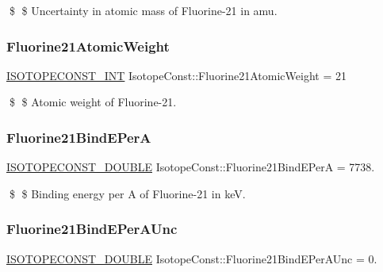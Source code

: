 \$ \$ Uncertainty in atomic mass of Fluorine-\/21 in amu. \mbox{\label{group___isotope_const-_fluorine-_f21_ga8ecdc839093fe8b2f0d6ca28c7af001a}} 
\subsubsection{\texorpdfstring{Fluorine21\+Atomic\+Weight}{Fluorine21AtomicWeight}}
{\footnotesize\ttfamily \mbox{\hyperlink{group___isotope_const-_macros_ga5f18360b3e99483a35c32d789e62621c}{I\+S\+O\+T\+O\+P\+E\+C\+O\+N\+S\+T\+\_\+\+I\+NT}} Isotope\+Const\+::\+Fluorine21\+Atomic\+Weight = 21}

\$ \$ Atomic weight of Fluorine-\/21. \mbox{\label{group___isotope_const-_fluorine-_f21_ga8d1382bebc1fc1184b1b12cb4f8cc928}} 
\subsubsection{\texorpdfstring{Fluorine21\+Bind\+E\+PerA}{Fluorine21BindEPerA}}
{\footnotesize\ttfamily \mbox{\hyperlink{group___isotope_const-_macros_ga8f45a7272ce02c0b4c65c44636ed719a}{I\+S\+O\+T\+O\+P\+E\+C\+O\+N\+S\+T\+\_\+\+D\+O\+U\+B\+LE}} Isotope\+Const\+::\+Fluorine21\+Bind\+E\+PerA = 7738.}

\$ \$ Binding energy per A of Fluorine-\/21 in keV. \mbox{\label{group___isotope_const-_fluorine-_f21_ga7149ff10b5ba22a673896d43b783395f}} 
\subsubsection{\texorpdfstring{Fluorine21\+Bind\+E\+Per\+A\+Unc}{Fluorine21BindEPerAUnc}}
{\footnotesize\ttfamily \mbox{\hyperlink{group___isotope_const-_macros_ga8f45a7272ce02c0b4c65c44636ed719a}{I\+S\+O\+T\+O\+P\+E\+C\+O\+N\+S\+T\+\_\+\+D\+O\+U\+B\+LE}} Isotope\+Const\+::\+Fluorine21\+Bind\+E\+Per\+A\+Unc = 0.}

